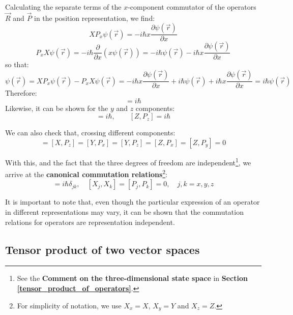 Calculating the separate terms of the $x$-component commutator of the operators $\vec{R}$ and $\vec{P}$ in the position representation, we find:
\begin{equation}
    XP_x\psi(\vec{r}) = -i\hbar x \frac{\partial \psi(\vec{r})}{\partial x}
\end{equation}
\begin{equation}
    P_xX\psi(\vec{r}) = -i\hbar \frac{\partial}{\partial x}(x\psi(\vec{r})) = -i\hbar \psi(\vec{r}) - i \hbar x \frac{\partial \psi(\vec{r})}{\partial x}
\end{equation}
so that:
\begin{equation}
    [X,P_x]\psi(\vec{r}) = XP_x\psi(\vec{r}) - P_xX\psi(\vec{r}) = -i\hbar x \frac{\partial \psi(\vec{r})}{\partial x} + i\hbar \psi(\vec{r}) + i\hbar x \frac{\partial \psi(\vec{r})}{\partial x} = i\hbar \psi(\vec{r})
\end{equation}
Therefore:
\begin{equation}
    [X,P_x] = i\hbar
\end{equation}
Likewise, it can be shown for the $y$ and $z$ components:
\begin{equation}
    [Y,P_y] = i\hbar, \qquad [Z,P_z] = i\hbar
\end{equation}

We can also check that, crossing different components:
\begin{equation}
    [X, P_y] = [X, P_z] = [Y, P_x] = [Y, P_z] = [Z, P_x] = [Z, P_y] = 0
\end{equation}

With this, and the fact that the three degrees of freedom are independent\footnote{See the \textbf{Comment on the three-dimensional state space} in \textbf{Section \ref{tensor_product_of_operators}}.}, we arrive at the \textbf{canonical commutation relations}\footnote{For simplicity of notation, we use $X_x= X$, $X_y=Y$ and $X_z=Z$.}:
\begin{equation}
    [X_j, P_k] = i\hbar \delta_{jk}, \quad [X_j, X_k] = [P_j, P_k] = 0, \quad j,k = x,y,z
\end{equation}

It is important to note that, even though the particular expression of an operator in different representations may vary, it can be shown that the commutation relations for operators are representation independent.

\subsection{Tensor product of two vector spaces}

